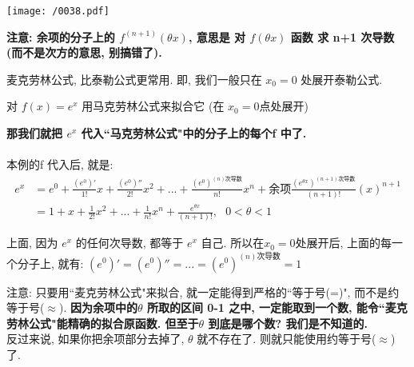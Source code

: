 \documentclass[UTF8]{ctexart}
\begin{document}
\texttt{[image: /0038.pdf]}

\textbf{注意: 余项的分子上的 $f^{\left( n+1 \right)}\left( \theta x \right) $, 意思是 对 $f(\theta x)$ 函数 求 n+1 次导数 (而不是次方的意思, 别搞错了).}


麦克劳林公式, 比泰勒公式更常用. 即, 我们一般只在 $x_0=0$ 处展开泰勒公式. \\


\begin{myEnvSample}
	对 $f(x)=e^x$ 用马克劳林公式来拟合它 (在 $x_0 = 0$点处展开)
	
	\textbf{那我们就把 $e^x$ 代入``马克劳林公式"中的分子上的每个f 中了.} \\
	
	 \\

	本例的f 代入后, 就是: 	
	\begin{align*}  %
			 e^x &= e^0+\frac{\left( e^0 \right) '}{1!}x+\frac{\left( e^0 \right) ''}{2!}x^2+...+\frac{\left( e^0 \right) ^{\left( n \right) \text{次导数}}}{n!}x^n+\text{余项}\frac{\left( e^{\theta x} \right) ^{\left( n+1 \right) \text{次导数}}}{\left( n+1 \right) !}\left( x \right) ^{n+1}\\
			& =1+x+\frac{1}{2!}x^2+...+\frac{1}{n!}x^n+\frac{e^{\theta x}}{\left( n+1 \right) !},\ \ \ 0<\theta <1		
	\end{align*}
	
上面, 因为 $e^x$ 的任何次导数, 都等于 $e^x$ 自己. 所以在$x_0 = 0$处展开后, 上面的每一个分子上, 就有: $\left( e^0 \right) '=\left( e^0 \right) ''=...=\left( e^0 \right) ^{\left( n \right) \text{次导数}} =1$ \\

\end{myEnvSample}



注意: 只要用``麦克劳林公式"来拟合, 就一定能得到严格的``等于号(=)", 而不是约等于号($\approx$). \textbf{因为余项中的$\theta$ 所取的区间 0-1 之中, 一定能取到一个数, 能令``麦克劳林公式"能精确的拟合原函数. 但至于$\theta$ 到底是哪个数? 我们是不知道的.} \\

反过来说, 如果你把余项部分去掉了, $\theta$ 就不存在了. 则就只能使用约等于号($\approx$)了. \\
\end{document}
